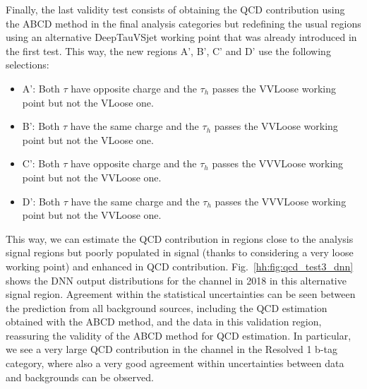 \documentclass[../main.tex]{subfiles}
\begin{document}
Finally, the last validity test consists of obtaining the QCD contribution using the ABCD method in the final analysis categories but redefining the usual regions using an alternative DeepTauVSjet working point that was already introduced in the first test. This way, the new regions A', B', C' and D' use the following selections:
\begin{itemize}
	\item A': Both $\tau$ have opposite charge and the $\tau_h$ passes the VVLoose working point but not the VLoose one.
	\item B': Both $\tau$ have the same charge and the $\tau_h$ passes the VVLoose working point but not the VLoose one.
	\item C': Both $\tau$ have opposite charge and the $\tau_h$ passes the VVVLoose working point but not the VVLoose one.
	\item D': Both $\tau$ have the same charge and the $\tau_h$ passes the VVVLoose working point but not the VVLoose one.
\end{itemize}

This way, we can estimate the QCD contribution in regions close to the analysis signal regions but poorly populated in signal (thanks to considering a very loose working point) and enhanced in QCD contribution. Fig.~\ref{hh:fig:qcd_test3_dnn} shows the DNN output distributions for the \tauh\tauh{} channel in 2018 in this alternative signal region. Agreement within the statistical uncertainties can be seen between the prediction from all background sources, including the QCD estimation obtained with the ABCD method, and the data in this validation region, reassuring the validity of the ABCD method for QCD estimation. In particular, we see a very large QCD contribution in the \tauh\tauh{} channel in the Resolved 1 b-tag category, where also a very good agreement within uncertainties between data and backgrounds can be observed.
\end{document}
